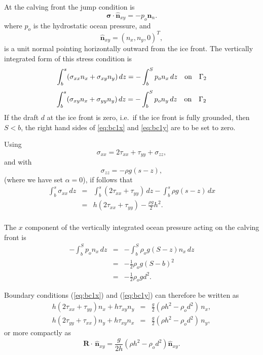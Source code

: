 \documentclass[10pt,a4paper]{book}
\newcommand{\txx}{\tau_{xx}}
\newcommand{\tyy}{\tau_{yy}}
\newcommand{\txy}{\tau_{xy}}
\newcommand{\sxx}{\sigma_{xx}}
\newcommand{\sxy}{\sigma_{xy}}
\newcommand{\syy}{\sigma_{yy}}
\newcommand{\szz}{\sigma_{zz}}
\newcommand{\normal}{\hat{\bm{n}}}
\begin{document}
\label{sec:bccalving}
At the calving front the jump condition is
\[\bm{\sigma} \cdot \normal_{xy}= -p_o \normal_n .\]
where $p_o$ is the hydrostatic ocean pressure, and
\[
\normal_{xy}=(n_x,n_y,0)^T ,
\] 
is a unit normal pointing horizontally
outward from the ice front.  The vertically integrated form of this stress condition  is
\begin{equation}
 \int_b^s ( \sxx n_x + \sxy n_y) \, dz = -\int_b^S  p_o n_x \, dz  \quad \hbox{on} \quad \Gamma_2 
\label{eq:bc1x}
\end{equation}
\begin{equation} \int_b^s (\sxy n_x + \syy n_y) \, dz = -\int_b^S p_o n_y \, dz \quad \hbox{on} \quad \Gamma_2 
\label{eq:bc1y}
\end{equation}
If the draft $d$ at the ice front is zero,
i.e.\ if the ice front is fully grounded, then $S<b$, the right hand
sides of \eqref{eq:bc1x} and \eqref{eq:bc1y} are to be set to zero.

Using
\[ \sxx=2 \txx +\tyy + \szz ,\]
and with
\[ \szz=-\rho g (s-z) ,\]
(where we have set $\alpha=0$), if follows that
\begin{eqnarray*}
\int_b^s \sxx \, dz &=& \int_b^s (2 \txx + \tyy) \, dz - \int_b^s \rho g (s-z) \, dx \nonumber \\
                    &=& h (2 \txx + \tyy)  - \frac{\rho g}{2} h^2 . \nonumber \\
\end{eqnarray*}

The $x$ component of the vertically integrated ocean pressure acting on the calving front is
\begin{eqnarray*}
-\int_b^S  p_o n_x \, dz &=& -\int_b^S  \rho_o g (S-z) n_x \, dz \\
&=& -\frac{1}{2} \rho_o g (S-b)^2 \\
&=& -\frac{1}{2} \rho_o g d^2 .
\end{eqnarray*}

Boundary conditions (\ref{eq:bc1x}) and (\ref{eq:bc1y}) can therefore be written as
\begin{eqnarray}
h (2 \txx + \tyy) n_x + h \txy n_y &=&  \frac{g}{2} (\rho h^2 - \rho_o  d^2)\, n_x ,\label{eq:bcgfx} \\
h (2 \tyy + \txx) n_y + h \txy n_x &=&  \frac{g}{2} (\rho h^2 - \rho_o  d^2)\, n_y ,\label{eq:bcgfy}
\end{eqnarray}
or more compactly as
\begin{equation}
\bm{R} \cdot \, \normal_{xy}=\frac{g}{2h} ( \rho h^2-\rho_o d^2) \normal_{xy} .
\label{eq:BCCF}
\end{equation}
\end{document}
